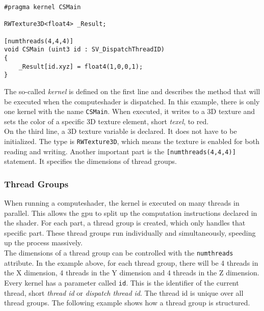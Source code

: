 \begin{lstlisting}[language=HLSL, caption=A standard \gls{computeshader} template., label=lst:shader:compute:standard]
#pragma kernel CSMain

RWTexture3D<float4> _Result;

[numthreads(4,4,4)]
void CSMain (uint3 id : SV_DispatchThreadID)
{
    _Result[id.xyz] = float4(1,0,0,1);
}
\end{lstlisting}

\noindent
The so-called \emph{\gls{kernel}} is defined on the first line and describes the method that will be executed when the \gls{computeshader} is dispatched.
In this example, there is only one \gls{kernel} with the name \lstinline[language=HLSL]{CSMain}.
When executed, it writes to a 3D texture and sets the color of a specific 3D texture element, short \emph{\gls{texel}}, to red.
\\
On the third line, a 3D texture variable is declared.
It does not have to be initialized.
The type is \lstinline[language=HLSL]{RWTexture3D}, which means the texture is enabled for both reading and writing.
Another important part is the \lstinline[language=HLSL]{[numthreads(4,4,4)]} statement. It specifies the dimensions of thread groups.

\subsubsection{Thread Groups}
When running a \gls{computeshader}, the \gls{kernel} is executed on many threads in parallel.
This allows the \gls{gpu} to split up the computation instructions declared in the \gls{shader}.
For each part, a thread group is created, which only handles that specific part.
These thread groups run individually and simultaneously, speeding up the process massively.
\\
The dimensions of a thread group can be controlled with the \lstinline[language=HLSL]{numthreads} attribute.
In the example above, for each thread group, there will be 4 threads in the X dimension, 4 threads in the Y dimension and 4 threads in the Z dimension.
\emptyline
Every \gls{kernel} has a parameter called \lstinline[language=HLSL]{id}. This is the identifier of the current thread, short \emph{thread id} or \emph{dispatch thread id}.
The thread id is unique over all thread groups. The following example shows how a thread group is structured.

